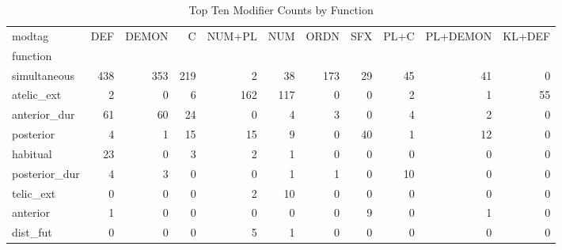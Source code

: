 \begin{table}[htbp!]
\centering
\caption{Top Ten Modifier Counts by Function}
\label{table:afmod_ct}
\begin{adjustbox}{width=1\textwidth}
\begin{tabular}{lrrrrrrrrrr}
\toprule
modtag &  DEF &  DEMON &    C &  NUM+PL &  NUM &  ORDN &  SFX &  PL+C &  PL+DEMON &  KL+DEF \\
function      &      &        &      &         &      &       &      &       &           &         \\
\midrule
simultaneous  &  438 &    353 &  219 &       2 &   38 &   173 &   29 &    45 &        41 &       0 \\
atelic\_ext    &    2 &      0 &    6 &     162 &  117 &     0 &    0 &     2 &         1 &      55 \\
anterior\_dur  &   61 &     60 &   24 &       0 &    4 &     3 &    0 &     4 &         2 &       0 \\
posterior     &    4 &      1 &   15 &      15 &    9 &     0 &   40 &     1 &        12 &       0 \\
habitual      &   23 &      0 &    3 &       2 &    1 &     0 &    0 &     0 &         0 &       0 \\
posterior\_dur &    4 &      3 &    0 &       0 &    1 &     1 &    0 &    10 &         0 &       0 \\
telic\_ext     &    0 &      0 &    0 &       2 &   10 &     0 &    0 &     0 &         0 &       0 \\
anterior      &    1 &      0 &    0 &       0 &    0 &     0 &    9 &     0 &         1 &       0 \\
dist\_fut      &    0 &      0 &    0 &       5 &    1 &     0 &    0 &     0 &         0 &       0 \\
\bottomrule
\end{tabular}
\end{adjustbox}
\end{table}
